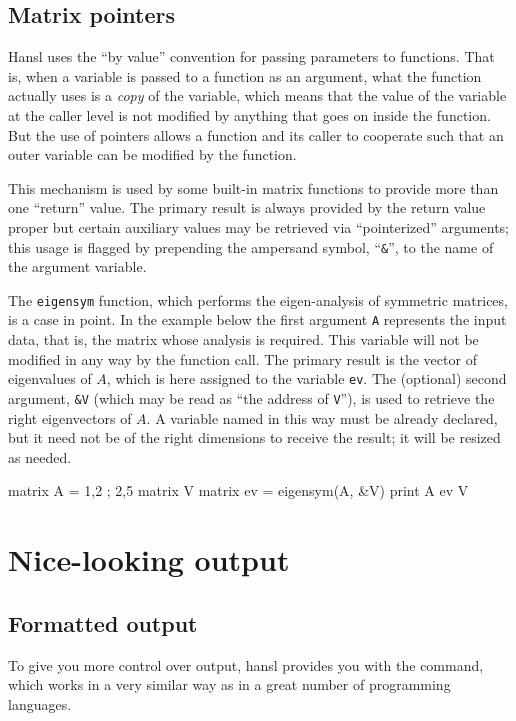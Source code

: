 \section{Matrix pointers}
\label{sec:mat-pointers}

Hansl uses the ``by value'' convention for passing parameters to
functions. That is, when a variable is passed to a function as an
argument, what the function actually uses is a \emph{copy} of the
variable, which means that the value of the variable at the caller
level is not modified by anything that goes on inside the function.
But the use of pointers allows a function and its caller to cooperate
such that an outer variable can be modified by the function.

This mechanism is used by some built-in matrix functions to provide
more than one ``return'' value. The primary result is always provided
by the return value proper but certain auxiliary values may be
retrieved via ``pointerized'' arguments; this usage is flagged by
prepending the ampersand symbol, ``\texttt{\&}'', to the name of the
argument variable.

The \texttt{eigensym} function, which performs the eigen-analysis of
symmetric matrices, is a case in point. In the example below the first
argument \texttt{A} represents the input data, that is, the matrix
whose analysis is required. This variable will not be modified in any
way by the function call. The primary result is the vector of
eigenvalues of $A$, which is here assigned to the variable
\texttt{ev}. The (optional) second argument, \texttt{\&V} (which may
be read as ``the address of \texttt{V}''), is used to retrieve the
right eigenvectors of $A$. A variable named in this way must be
already declared, but it need not be of the right dimensions to
receive the result; it will be resized as needed.
\begin{code}
matrix A = {1,2 ; 2,5}
matrix V
matrix ev = eigensym(A, &V)
print A ev V
\end{code}

\chapter{Nice-looking output}
\label{chap:formatting}

\section{Formatted output}
\label{sec:printf}

To give you more control over output, hansl provides you with the
 command, which works in a very similar way as in a great
number of programming languages.

